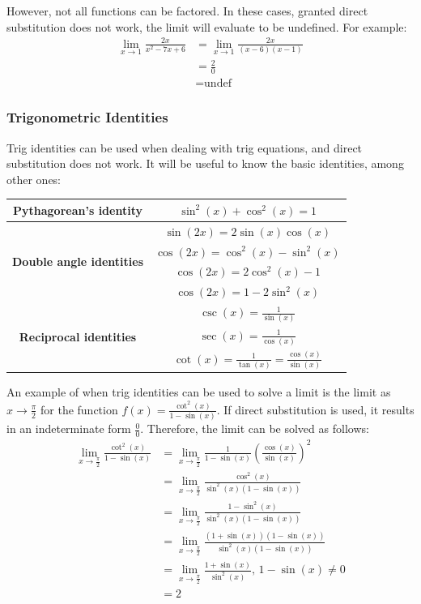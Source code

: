\documentclass[12pt]{article}
\begin{document}
However, not all functions can be factored. In these cases, granted direct substitution does not work, the limit will evaluate to be undefined. For example:
\begin{align*}
	\lim_{x \to 1} \frac{2x}{x^2 - 7x + 6} &= \lim_{x \to 1} \frac{2x}{(x-6)(x-1)} \\
	&= \frac{2}{0} \\
	&= \text{undef}
\end{align*}

\subsubsection{Trigonometric Identities}
Trig identities can be used when dealing with trig equations, and direct substitution does not work. It will be useful to know the basic identities, among other ones:
\begin{table}[H]
	\centering
	\begin{tabular}{|c|c|}
		\hline
		\textbf{Pythagorean's identity} & $\sin^2(x) + \cos^2(x) = 1$ \\
		\hline
		\multirow{4}{*}{\textbf{Double angle identities}} & $\sin(2x) = 2 \sin(x) \cos(x)$ \\
		& $\cos(2x) = \cos^2(x) - \sin^2(x)$ \\
		& $\cos(2x) = 2\cos^2(x) - 1$ \\
		& $\cos(2x) = 1 - 2\sin^2(x)$ \\
		\hline
		\multirow{3}{*}{\textbf{Reciprocal identities}} & $\csc(x) = \frac{1}{\sin(x)}$ \\[5pt]
		& $\sec(x) = \frac{1}{\cos(x)}$ \\[5pt]
		& $\cot(x) = \frac{1}{\tan(x)} = \frac{\cos(x)}{\sin(x)}$ \\[5pt]
		\hline
	\end{tabular}
\end{table}

An example of when trig identities can be used to solve a limit is the limit as $x \to \frac{\pi}{2}$ for the function $f(x) = \frac{\cot^2(x)}{1 - \sin(x)}$. If direct substitution is used, it results in an indeterminate form $\frac{0}{0}$. Therefore, the limit can be solved as follows:
\begin{align*}
	\lim_{x \to \frac{\pi}{2}} \frac{\cot^2(x)}{1 - \sin(x)} &= \lim_{x \to \frac{\pi}{2}} \frac{1}{1 - \sin(x)} \left( \frac{\cos(x)}{\sin(x)} \right)^2 \\[5pt]
	&= \lim_{x \to \frac{\pi}{2}} \frac{\cos^2(x)}{\sin^2(x) (1 - \sin(x))} \\[5pt]
	&= \lim_{x \to \frac{\pi}{2}} \frac{1 - \sin^2(x)}{\sin^2(x) (1 - \sin(x))} \\[5pt]
	&= \lim_{x \to \frac{\pi}{2}} \frac{(1 + \sin(x))(1 - \sin(x))}{\sin^2(x) (1 - \sin(x))} \\[5pt]
	&= \lim_{x \to \frac{\pi}{2}} \frac{1 + \sin(x)}{\sin^2(x)} , \, 1 - \sin(x) \ne 0 \\[5pt]
	&= 2
\end{align*}
\end{document}
